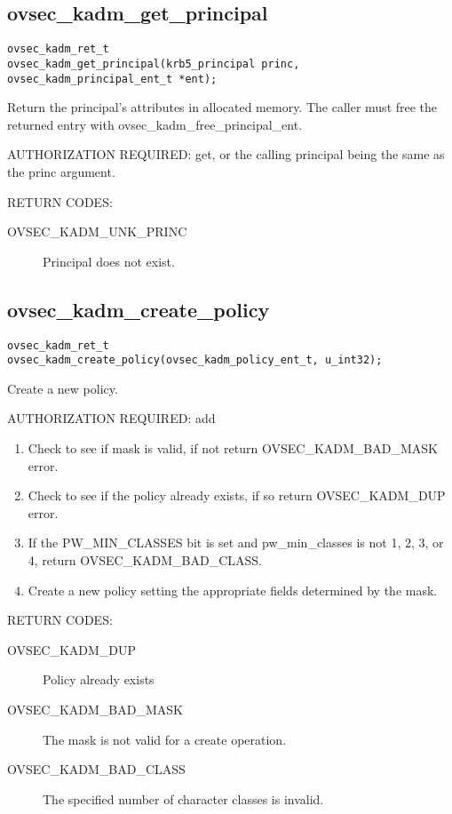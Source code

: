 \subsection{ovsec_kadm_get_principal}

\begin{verbatim}
ovsec_kadm_ret_t
ovsec_kadm_get_principal(krb5_principal princ, ovsec_kadm_principal_ent_t *ent);  
\end{verbatim}

Return the principal's attributes in allocated memory.  The caller
must free the returned entry with ovsec_kadm_free_principal_ent.

AUTHORIZATION REQUIRED: get, or the calling principal being the same
as the princ argument.

RETURN CODES:

\begin{description}
\item[OVSEC_KADM_UNK_PRINC] Principal does not exist.
\end{description}

\subsection{ovsec_kadm_create_policy}

\begin{verbatim}
ovsec_kadm_ret_t
ovsec_kadm_create_policy(ovsec_kadm_policy_ent_t, u_int32); 
\end{verbatim}

Create a new policy.

AUTHORIZATION REQUIRED: add

\begin{enumerate}
\item Check to see if mask is valid, if not return OVSEC_KADM_BAD_MASK error.
\item Check to see if the policy already exists, if so return
OVSEC_KADM_DUP error. 
\item If the PW_MIN_CLASSES bit is set and pw_min_classes is not 1, 2,
3, or 4, return OVSEC_KADM_BAD_CLASS.
\item Create a new policy setting the appropriate fields determined
by the mask.
\end{enumerate}

RETURN CODES:

\begin{description}
\item[OVSEC_KADM_DUP] Policy already exists
\item[OVSEC_KADM_BAD_MASK] The mask is not valid for a create
operation.
\item[OVSEC_KADM_BAD_CLASS] The specified number of character classes
is invalid.
\end{description}

